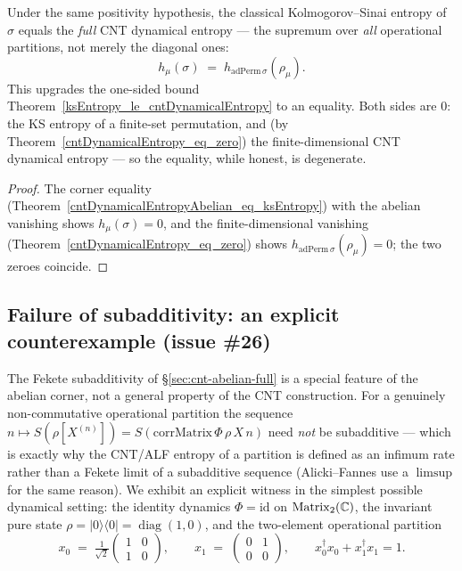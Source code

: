 \begin{theorem}[KS entropy \(=\) full CNT dynamical entropy]\label{ksEntropy_eq_cntDynamicalEntropy}
  \leanok
  Under the same positivity hypothesis, the classical Kolmogorov--Sinai entropy of \(\sigma\) equals
  the \emph{full} CNT dynamical entropy --- the supremum over \emph{all} operational partitions, not
  merely the diagonal ones:
  \[
    h_\mu(\sigma) \;=\; h_{\mathrm{adPerm}\,\sigma}(\rho_\mu).
  \]
  This upgrades the one-sided bound Theorem~\ref{ksEntropy_le_cntDynamicalEntropy} to an equality.
  Both sides are \(0\): the KS entropy of a finite-set permutation, and (by
  Theorem~\ref{cntDynamicalEntropy_eq_zero}) the finite-dimensional CNT dynamical entropy --- so the
  equality, while honest, is degenerate.
\end{theorem}
\begin{proof}\leanok
  The corner equality (Theorem~\ref{cntDynamicalEntropyAbelian_eq_ksEntropy}) with the abelian
  vanishing shows \(h_\mu(\sigma) = 0\), and the finite-dimensional vanishing
  (Theorem~\ref{cntDynamicalEntropy_eq_zero}) shows \(h_{\mathrm{adPerm}\,\sigma}(\rho_\mu) = 0\);
  the two zeroes coincide.
\end{proof}

\subsection{Failure of subadditivity: an explicit counterexample (issue \#26)}
\label{sec:cnt-counterexample}

The Fekete subadditivity of \S\ref{sec:cnt-abelian-full} is a special feature of the abelian corner,
not a general property of the CNT construction. For a genuinely non-commutative operational partition
the sequence \(n\mapsto S(\rho[X^{(n)}]) = S(\mathrm{corrMatrix}\,\Phi\,\rho\,X\,n)\) need \emph{not}
be subadditive --- which is exactly why the CNT/ALF entropy of a partition is defined as an infimum
rate rather than a Fekete limit of a subadditive sequence (Alicki--Fannes use a \(\limsup\) for the
same reason). We exhibit an explicit witness in the simplest possible dynamical setting: the identity
dynamics \(\Phi = \mathrm{id}\) on \(\operatorname{Matrix}_2(\mathbb{C})\), the invariant pure state
\(\rho = |0\rangle\langle 0| = \operatorname{diag}(1,0)\), and the two-element operational partition
\[
  x_0 \;=\; \tfrac{1}{\sqrt 2}\begin{pmatrix}1 & 0\\ 1 & 0\end{pmatrix},\qquad
  x_1 \;=\; \begin{pmatrix}0 & 1\\ 0 & 0\end{pmatrix},\qquad
  x_0^{\dagger}x_0 + x_1^{\dagger}x_1 = 1.
\]

